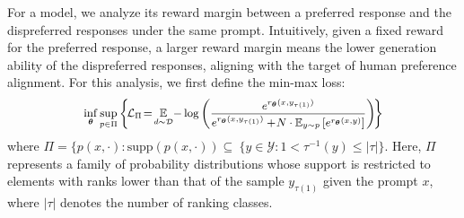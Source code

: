 For a model,  we analyze its reward  margin between a preferred response and the dispreferred responses under the same prompt.  Intuitively, given a fixed reward for the preferred response, a larger reward  margin  means the lower generation ability of the dispreferred responses, aligning with the target of human preference alignment. For this analysis, we first define the min-max loss:
\vspace{-2pt}
\begin{equation}
\fontsize{9}{3}\selectfont{
\begin{aligned}
\label{2player}
\inf\limits_{\wm}\sup\limits_{p\in\Pi}\left\{ \!
			\mathcal{L}_{\Pi} \!=\! \expectation_{d\sim\mathcal{D}}   \!
			-\log\left(\frac{e^{{ r_{\wm}(x,y_{\tau\left( 1\right)})}}}{e^{{ r_{\wm}(x,y_{\tau\left( 1\right)})}}+\! N\cdot\expectation\nolimits_{y \sim p}\left[e^{{r_{\wm}(x,y)}}\right]}\right) \!\right\}
\end{aligned}}
\end{equation}
where $\Pi=\{p(x,\cdot):\text{supp}\left(p(x,\cdot)\right)\subseteq\ \{y\in \mathcal{Y}:1<\tau^{-1}(y)\leq|\tau|\}$. Here, $\Pi$ represents a family of probability distributions whose support is restricted to elements with ranks lower than that of the sample $y_{\tau(1)}$ given the prompt $x$, where $|\tau|$ denotes the number of ranking classes.

 

